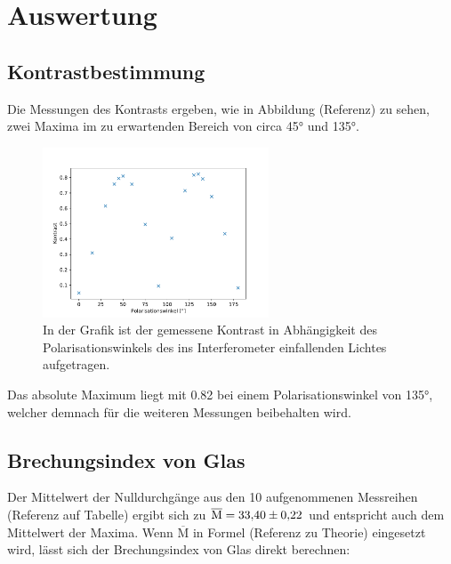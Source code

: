 \newpage
\section{Auswertung}

    \subsection{Kontrastbestimmung}
        Die Messungen des Kontrasts ergeben, wie in Abbildung (Referenz) zu sehen, zwei Maxima im zu erwartenden Bereich von circa 45° und 135°.
        
        \FloatBarrier

        \begin{figure}[h]
          \centering
          \includegraphics[width = 0.6\textwidth]{pictures/Kontrast.pdf}
          \caption{In der Grafik ist der gemessene Kontrast in Abhängigkeit des Polarisationswinkels des ins Interferometer einfallenden Lichtes aufgetragen.}
          \label{fig:Aufbau}
        \end{figure}

        \FloatBarrier

        Das absolute Maximum liegt mit \num{0.82} bei einem Polarisationswinkel von 135°, welcher demnach für die weiteren Messungen beibehalten wird.



    \subsection{Brechungsindex von Glas}
        Der Mittelwert der Nulldurchgänge aus den 10 aufgenommenen Messreihen (Referenz auf Tabelle) ergibt sich zu $\overline{\text{M}} = \num{33.40 +- 0.22}$ und entspricht auch dem Mittelwert der Maxima.
        Wenn $\overline{\text{M}}$ in Formel (Referenz zu Theorie) eingesetzt wird, lässt sich der Brechungsindex von Glas direkt berechnen:

